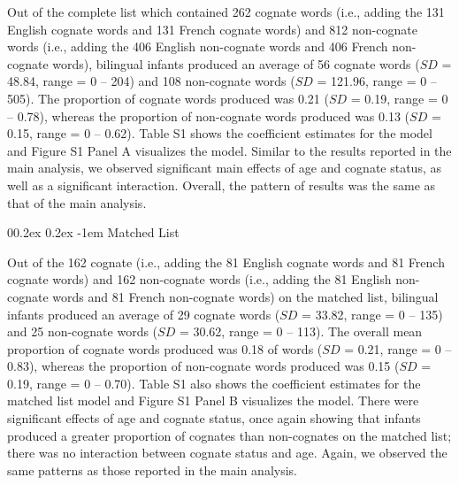 \documentclass[
  ,man,floatsintext]{apa6}
\makeatletter
\let\oldparagraph\paragraph
\renewcommand{\paragraph}[1]{\oldparagraph{#1}\mbox{}}
\renewcommand{\paragraph}{\@startsection{paragraph}{4}{\parindent}%
  {0\baselineskip \@plus 0.2ex \@minus 0.2ex}%
  {-1em}%
  {\normalfont\normalsize\bfseries\itshape\typesectitle}}
\makeatother
\begin{document}
Out of the complete list which contained 262 cognate words (i.e., adding the 131 English cognate words and 131 French cognate words) and 812 non-cognate words (i.e., adding the 406 English non-cognate words and 406 French non-cognate words), bilingual infants produced an average of 56 cognate words (\(SD\) = 48.84, range = 0 -- 204) and 108 non-cognate words (\(SD\) = 121.96, range = 0 -- 505). The proportion of cognate words produced was 0.21 (\(SD\) = 0.19, range = 0 -- 0.78), whereas the proportion of non-cognate words produced was 0.13 (\(SD\) = 0.15, range = 0 -- 0.62). Table S1 shows the coefficient estimates for the model and Figure S1 Panel A visualizes the model. Similar to the results reported in the main analysis, we observed significant main effects of age and cognate status, as well as a significant interaction. Overall, the pattern of results was the same as that of the main analysis.

\hypertarget{matched-list}{%
\paragraph{Matched List}\label{matched-list}}

Out of the 162 cognate (i.e., adding the 81 English cognate words and 81 French cognate words) and 162 non-cognate words (i.e., adding the 81 English non-cognate words and 81 French non-cognate words) on the matched list, bilingual infants produced an average of 29 cognate words (\(SD\) = 33.82, range = 0 -- 135) and 25 non-cognate words (\(SD\) = 30.62, range = 0 -- 113). The overall mean proportion of cognate words produced was 0.18 of words (\(SD\) = 0.21, range = 0 -- 0.83), whereas the proportion of non-cognate words produced was 0.15 (\(SD\) = 0.19, range = 0 -- 0.70). Table S1 also shows the coefficient estimates for the matched list model and Figure S1 Panel B visualizes the model. There were significant effects of age and cognate status, once again showing that infants produced a greater proportion of cognates than non-cognates on the matched list; there was no interaction between cognate status and age. Again, we observed the same patterns as those reported in the main analysis.
\end{document}
